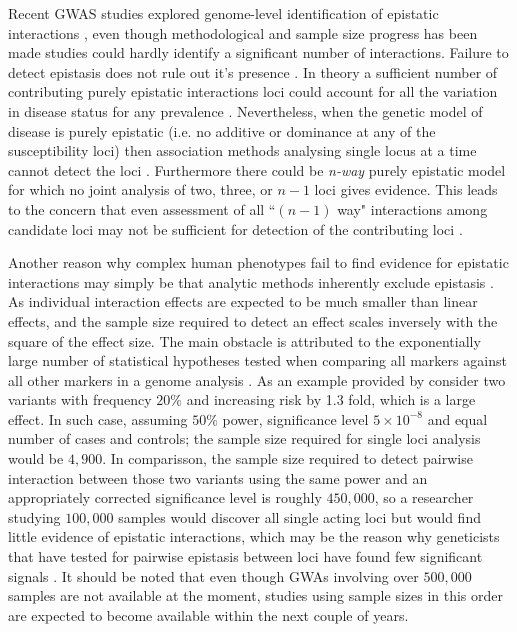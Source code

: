 Recent GWAS studies explored genome-level identification of epistatic interactions \cite{ackermann2012systematic}, even though methodological and sample size progress has been made studies could hardly identify a significant number of interactions. 
Failure to detect epistasis does not rule out it's presence \cite{zuk2012mystery}.
In theory a sufficient number of contributing purely epistatic interactions loci could account for all the variation in disease status for any prevalence \cite{culverhouse2002perspective}.
Nevertheless, when the genetic model of disease is purely epistatic (i.e. no additive or dominance at any of the susceptibility loci) then association methods analysing single locus at a time cannot detect the loci \cite{culverhouse2002perspective}.
Furthermore there could be \textit{n-way} purely epistatic model for which no joint analysis of two, three, or $n-1$ loci gives evidence.
This leads to the concern that even assessment of all ``$(n-1)$ way" interactions among candidate loci may not be sufficient for detection of the contributing loci \cite{culverhouse2002perspective}.

Another reason why complex human phenotypes fail to find evidence for epistatic interactions may simply be that analytic methods inherently exclude epistasis \cite{culverhouse2002perspective}.
As individual interaction effects are expected to be much smaller than linear effects, and the sample size required to detect an effect scales inversely with the square of the effect size. 
The main obstacle is attributed to the exponentially large number of statistical hypotheses tested when comparing all markers against all other markers in a genome analysis \cite{ackermann2012systematic}.
As an example provided by \cite{zuk2012mystery} consider two variants with frequency $20\%$ and increasing risk by 1.3 fold, which is a large effect.
In such case, assuming $50\%$ power, significance level $5 \times 10^{-8}$  and equal number of cases and controls; the sample size required for single loci analysis would be $4,900$.
In comparisson, the sample size required to detect pairwise interaction between those two variants using the same power and an appropriately corrected significance level is roughly $450,000$, so a researcher studying $100,000$ samples would discover all single acting loci but would find little evidence of epistatic interactions, which may be the reason why geneticists that have tested for pairwise epistasis between loci have found few significant signals \cite{zuk2012mystery}.
It should be noted that even though GWAs involving over $500,000$ samples are not available at the moment, studies using sample sizes in this order are expected to become available within the next couple of years.

